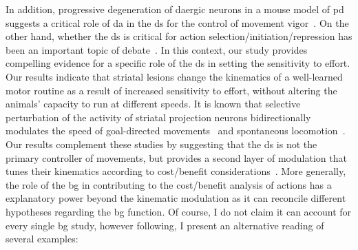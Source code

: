 In addition, progressive degeneration of \gls{da}ergic neurons in a mouse model of \gls{pd} suggests a critical role of \gls{da} in the \gls{ds} for the control of movement vigor~\cite{Panigrahi2015Cell}.
On the other hand, whether the \gls{ds} is critical for action selection/initiation/repression has been an important topic of debate~\cite{Turner2010CurrOpinNeurobiol, Dudman2016CurrOpinNeurobiol}.
In this context, our study provides compelling evidence for a specific role of the \gls{ds} in setting the sensitivity to effort.
Our results indicate that striatal lesions change the kinematics of a well-learned motor routine as a result of increased sensitivity to effort, without altering the animals' capacity to run at different speeds.
It is known that selective perturbation of the activity of striatal projection neurons bidirectionally modulates the speed of goal-directed movements~\cite{Yttri2016Nature} and spontaneous locomotion~\cite{Kravitz2010Nature}.
Our results complement these studies by suggesting that the \gls{ds} is not the primary controller of movements, but provides a second layer of modulation that tunes their kinematics according to cost/benefit considerations~\cite{Berke2018NN,Beeler2012Fron}.
More generally, the role of the \gls{bg} in contributing to the cost/benefit analysis of actions has a explanatory power beyond the kinematic modulation as it can reconcile different hypotheses regarding the \gls{bg} function.
Of course, I do not claim it can account for every single \gls{bg} study, however following, I present an alternative reading of several examples:
